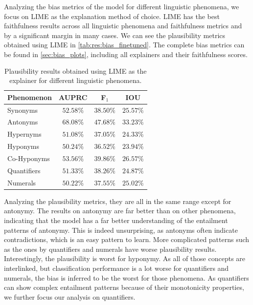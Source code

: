 Analyzing the bias metrics of the model for different linguistic phenomena, we focus on \ac{LIME} as the explanation method of choice. \ac{LIME} has the best faithfulness results across all linguistic phenomena and faithfulness metrics and by a significant margin in many cases. We can see the plausibility metrics obtained using \ac{LIME} in \autoref{tab:res:bias_finetuned}. The complete bias metrics can be found in \autoref{sec:bias_plots}, including all explainers and their faithfulness scores.

\begin{table}[ht!]
    \centering
    \caption{Plausibility results obtained using \ac{LIME} as the explainer for different linguistic phenomena.}
    \begin{tabular}{l c c c}
        \toprule
        \multicolumn{1}{c}{Phenomenon} & \acs{AUPRC} & F$_1$ & \acs{IOU}\\
        \midrule
        Synonyms & $52.58\%$ & $38.50\%$ & $25.57\%$ \\
        Antonyms & $68.08\%$ & $47.68\%$ & $33.23\%$ \\
        Hypernyms & $51.08\%$ & $37.05\%$ & $24.33\%$ \\
        Hyponyms & $50.24\%$ & $36.52\%$ & $23.94\%$ \\
        Co-Hyponyms & $53.56\%$ & $39.86\%$ & $26.57\%$ \\
        Quantifiers & $51.33\%$ & $38.26\%$ & $24.87\%$ \\
        Numerals & $50.22\%$ & $37.55\%$ & $25.02\%$ \\
        \bottomrule
    \end{tabular}
    \label{tab:res:bias_finetuned}
\end{table}

Analyzing the plausibility metrics, they are all in the same range except for antonymy. The results on antonymy are far better than on other phenomena, indicating that the model has a far better understanding of the entailment patterns of antonymy. This is indeed unsurprising, as antonyms often indicate contradictions, which is an easy pattern to learn. More complicated patterns such as the ones by quantifiers and numerals have worse plausibility results. Interestingly, the plausibility is worst for hyponymy. As all of those concepts are interlinked, but classification performance is a lot worse for quantifiers and numerals, the bias is inferred to be the worst for those phenomena. As quantifiers can show complex entailment patterns because of their monotonicity properties, we further focus our analysis on quantifiers.

